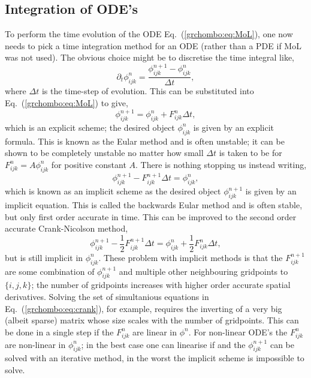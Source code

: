 \subsection{Integration of ODE's}
To perform the time evolution of the ODE Eq.~(\ref{grchombo:eq:MoL}), one now needs to pick a time integration method for an ODE (rather than a PDE if MoL was not used). The obvious choice might be to discretise the time integral like,
\begin{equation}
\partial_t \phi^n_{ijk} = \frac{\phi^{n+1}_{ijk} - \phi^n_{ijk}}{\Delta t},
\end{equation} 
where $\Delta t$ is the time-step of evolution. This can be substituted into Eq.~(\ref{grchombo:eq:MoL}) to give,
\begin{equation}
\phi^{n+1}_{ijk} = \phi^n_{ijk} + {F}^n_{ijk}  \Delta t, \label{grchombo:eq:eulermethod}
\end{equation} 
which is an explicit scheme; the desired object $\phi^n_{ijk}$ is given by an explicit formula. This is known as the Eular method and is often unstable; it can be shown to be completely unstable no matter how small $\Delta t$ is taken to be for $F^n_{ijk} = A \phi^n_{ijk}$ for positive constant $A$. There is nothing stopping us instead writing,
\begin{equation}
\phi^{n+1}_{ijk} -  {F}^{n+1}_{ijk} \Delta t = \phi^n_{ijk},
\end{equation} 
which is known as an implicit scheme as the desired object $\phi^{n+1}_{ijk}$ is given by an implicit equation. This is called the backwards Eular method and is often stable, but only first order accurate in time. This can be improved to the second order accurate Crank-Nicolson method,
\begin{equation}
\phi^{n+1}_{ijk} -  \frac{1}{2}{F}^{n+1}_{ijk} \Delta t = \phi^n_{ijk} +  \frac{1}{2}{F}^{n}_{ijk} \Delta t, \label{grchombo:eq:crank}
\end{equation} 
but is still implicit in $\phi^n_{ijk}$. These problem with implicit methods is that the $F^{n+1}_{ijk}$ are some combination of $\phi^{n+1}_{ijk}$ and multiple other neighbouring gridpoints to $\{i,j,k\}$; the number of gridpoints increases with higher order accurate spatial derivatives. Solving the set of simultanious equations in Eq.~(\ref{grchombo:eq:crank}), for example, requires the inverting of a very big (albeit sparse) matrix whose size scales with the number of gridpoints. This can be done in a single step if the $F^n_{ijk}$ are linear in $\phi^n$. For non-linear ODE's the $F^n_{ijk}$ are non-linear in $\phi^n_{ijk}$; in the best case one can linearise if and the $\phi^{n+1}_{ijk}$ can be solved with an iterative method, in the worst the implicit scheme is impossible to solve.

